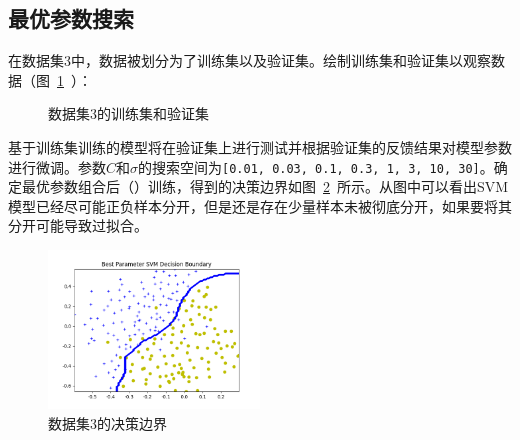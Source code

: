 \documentclass{SEU-AI-Report}
\begin{document}
\subsection{最优参数搜索}\label{sec:optimal}

在数据集3中，数据被划分为了训练集以及验证集。绘制训练集和验证集以观察数据（图~\ref{fig:dataset3}~）：
\begin{figure}[htbp]
    \centering
    \hfill
    \caption{数据集3的训练集和验证集}
    \label{fig:dataset3}
\end{figure}

基于训练集训练的模型将在验证集上进行测试并根据验证集的反馈结果对模型参数进行微调。参数$C$和$\sigma$的搜索空间为\texttt{[0.01, 0.03, 0.1, 0.3, 1, 3, 10, 30]}。确定最优参数组合后（）训练，得到的决策边界如图~\ref{fig:result3}~所示。从图中可以看出SVM模型已经尽可能正负样本分开，但是还是存在少量样本未被彻底分开，如果要将其分开可能导致过拟合。
\begin{figure}[htbp]
    \centering
    \includegraphics[width=0.5\textwidth]{figure/fig7.png}
    \caption{数据集3的决策边界}
    \label{fig:result3}
\end{figure}
\end{document}
